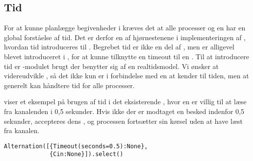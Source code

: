 \subsection{Tid} \label{sec:tid}
For at kunne planlægge begivenheder i \des kræves det at alle processer og \sched en har en global forståelse af tid.  Det er derfor en af hjørnestenene i implementeringen af \des, hvordan tid introduceres til \pycsp.  
Begrebet tid er ikke en del af \csp, men er alligevel blevet introduceret i \pycsp, for  at  kunne tilknytte en timeout til en . Til at introducere tid er -modulet brugt der benytter sig af en realtidsmodel.  Vi ønsker
at videreudvikle \pycsp, så det ikke kun er i forbindelse med en  at \pycsp kender til tiden, men at \pycsp generelt kan håndtere tid for alle
processer.
 
 viser et eksempel på brugen af tid i det eksisterende \pycsp, hvor en  er villig
til at læse fra kanalenden  i 0,5 sekunder. Hvis ikke der
er modtaget en besked indenfor 0,5 sekunder, accepteres dens ,
og processen fortsætter sin kørsel uden at have læst fra kanalen.

\begin{lstlisting}[float=hbtp, 
label=Timeout,caption=Timeout i Alternation (fra dokumentationen til PyCSP)]
Alternation([{Timeout(seconds=0.5):None}, 
             {Cin:None}]).select()
\end{lstlisting}



